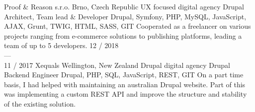 \documentclass[]{friggeri-cv} %
\begin{document}
\begin{entrylist}
  {Proof \& Reason s.r.o.}
  {Brno, Czech Republic}
  {UX focused digital agency}
  {
  \position
  {Drupal Architect, Team lead \& Developer}
  {Drupal, Symfony, PHP, MySQL, JavaScript, AJAX, Grunt, TWIG, HTML, SASS, GIT}
  {
  Cooperated as a freelancer on various projects ranging from e-commerce solutions to publishing platforms, leading a team of up to 5 developers.
  }%
  }
  \job
  {12 / 2018 \\ --- \\ 11 / 2017}
  {Xequals}
  {Wellington, New Zealand}
  {Drupal digital agency}
  {
    \position
      {Drupal Backend Engineer}
      {Drupal, PHP, SQL, JavaScript, REST, GIT}
      {
        On a part time basis, I had helped with maintaining an australian Drupal website. Part of this
        was implementing a custom REST API and improve the structure and stability of the existing solution.
      }
  }
\end{entrylist}
\end{document}
